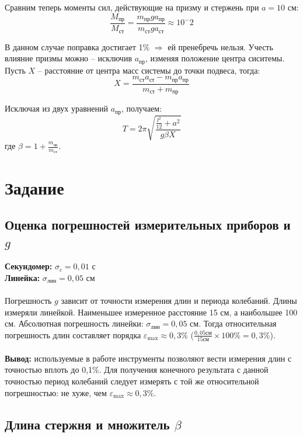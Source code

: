\documentclass[a4paper,12pt]{article}
\begin{document}
 	Сравним теперь моменты сил, действующие на призму и стержень при $a = 10$ см:
 	\begin{equation}
 		\frac{M_\text{пр}}{M_\text{ст}} = \frac{m_\text{пр}ga_\text{пр}}{m_\text{ст}ga_\text{ст}} \approx 10^-2
 	\end{equation}
 	
 	В данном случае поправка достигает 1\% $\Rightarrow$ ей пренебречь нельзя. Учесть влияние призмы можно -- исключив $a_\text{пр}$, изменяя положение центра сиситемы. Пусть $X$ -- расстояние от центра масс системы до точки подвеса, тогда:
 	\begin{equation}
 		X=\frac{m_\text{ст}a_\text{ст}-m_\text{пр}a_\text{пр}}{m_\text{ст} + m_\text{пр}}
 	\end{equation}
 	
 	
 	Исключая из двух уравнений $a_\text{пр}$, получаем:
 	\begin{equation}\label{period}
 		T = 2\pi \sqrt{\frac{\frac{l^2}{12}+a^2}{g\beta X}}
 	\end{equation}	
 	\noindent где $\beta= 1+\frac{m_\text{пр}}{m_\text{ст}}$.
 	\section{Задание}
 	\subsection{Оценка погрешностей измерительных приборов и $g$}
 	\textbf{Секундомер:} $ \sigma_c = 0,01 \text{ с}$\\
 	\textbf{Линейка:} $ \sigma_\text{лин} = 0,05 \text{ см}$\\\\
 	Погрешность $g$ зависит от точности измерения длин и периода колебаний. Длины измеряли линейкой. Наименьшее измеренное расстояние 15 см, а наибольшее 100 см. Абсолютная погрешность линейки: $\sigma_\text{лин} = 0,05 \text{ см}$. Тогда относительная погрешность длин составляет порядка $\varepsilon_\text{max}\approx0,3\%$  ($\frac{0,05см}{15см}\times100\% = 0,3\%$).\\\\
 	\textbf{Вывод:} используемые в работе инструменты позволяют вести измерения длин с точностью вплоть до 0,1\%. Для получения конечного результата с данной точностью период колебаний следует измерять с той же относительной погрешностью: не хуже, чем $\varepsilon_\text{max}\approx0,3\%$.
 	\subsection{Длина стержня и множитель $\beta$}
 	
\end{document}
